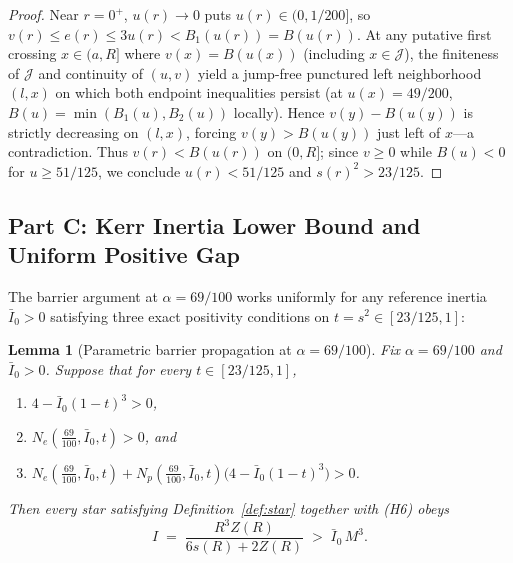 \documentclass[11pt]{article}
\theoremstyle{plain}
\newtheorem{lemma}[theorem]{Lemma}
\theoremstyle{definition}
\newcommand{\Ibar}{\bar{I}}
\begin{document}
\begin{proof}
Near $r = 0^+$, $u(r) \to 0$ puts $u(r) \in (0, 1/200]$, so $v(r) \le e(r) \le 3 u(r) < B_1(u(r)) = B(u(r))$. At any putative first crossing $x \in (a, R]$ where $v(x) = B(u(x))$ (including $x \in \mathcal{J}$), the finiteness of $\mathcal{J}$ and continuity of $(u, v)$ yield a jump-free punctured left neighborhood $(l, x)$ on which both endpoint inequalities persist (at $u(x)=49/200$, $B(u) = \min(B_1(u), B_2(u))$ locally). Hence $v(y) - B(u(y))$ is strictly decreasing on $(l, x)$, forcing $v(y) > B(u(y))$ just left of $x$---a contradiction. Thus $v(r) < B(u(r))$ on $(0, R]$; since $v \ge 0$ while $B(u) < 0$ for $u \ge 51/125$, we conclude $u(r) < 51/125$ and $s(r)^2 > 23/125$.
\end{proof}

\subsection{Part C: Kerr Inertia Lower Bound and Uniform Positive Gap}

The barrier argument at $\alpha = 69/100$ works uniformly for any reference inertia $\Ibar_0 > 0$ satisfying three exact positivity conditions on $t = s^2 \in [23/125, 1]$:

\begin{lemma}[Parametric barrier propagation at $\alpha = 69/100$]
\label{lem:parametric-partC}
Fix $\alpha = 69/100$ and $\Ibar_0 > 0$. Suppose that for every $t \in [23/125, 1]$,
\begin{enumerate}
  \item $4 - \Ibar_0 (1 - t)^3 > 0$,
  \item $N_e(\tfrac{69}{100}, \Ibar_0, t) > 0$, and
  \item $N_e(\tfrac{69}{100}, \Ibar_0, t) + N_p(\tfrac{69}{100}, \Ibar_0, t)\bigl(4 - \Ibar_0 (1 - t)^3\bigr) > 0$.
\end{enumerate}
Then every star satisfying Definition~\ref{def:star} together with (H6) obeys
\begin{equation}
  I \;=\; \frac{R^3 Z(R)}{6 s(R) + 2 Z(R)} \;>\; \Ibar_0\,M^3.
  \label{eq:parametric-bound}
\end{equation}
\end{lemma}
\end{document}
